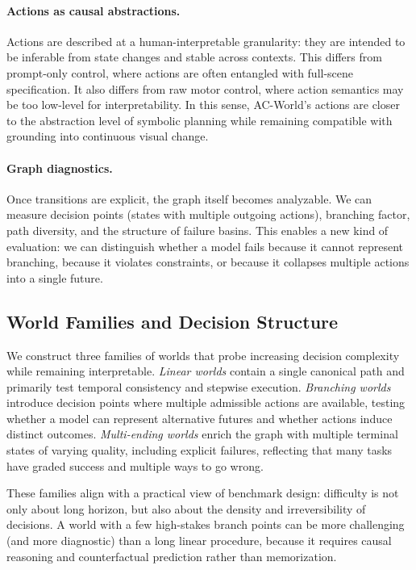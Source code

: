 \documentclass{article}
\theoremstyle{plain}
\theoremstyle{definition}
\theoremstyle{remark}
\begin{document}
\paragraph{Actions as causal abstractions.}
Actions are described at a human-interpretable granularity: they are intended to be inferable from state changes and stable across contexts. This differs from prompt-only control, where actions are often entangled with full-scene specification. It also differs from raw motor control, where action semantics may be too low-level for interpretability. In this sense, AC-World's actions are closer to the abstraction level of symbolic planning while remaining compatible with grounding into continuous visual change.

\paragraph{Graph diagnostics.}
Once transitions are explicit, the graph itself becomes analyzable. We can measure decision points (states with multiple outgoing actions), branching factor, path diversity, and the structure of failure basins. This enables a new kind of evaluation: we can distinguish whether a model fails because it cannot represent branching, because it violates constraints, or because it collapses multiple actions into a single future.

\subsection{World Families and Decision Structure}
We construct three families of worlds that probe increasing decision complexity while remaining interpretable.
\emph{Linear worlds} contain a single canonical path and primarily test temporal consistency and stepwise execution. \emph{Branching worlds} introduce decision points where multiple admissible actions are available, testing whether a model can represent alternative futures and whether actions induce distinct outcomes. \emph{Multi-ending worlds} enrich the graph with multiple terminal states of varying quality, including explicit failures, reflecting that many tasks have graded success and multiple ways to go wrong.

These families align with a practical view of benchmark design: difficulty is not only about long horizon, but also about the density and irreversibility of decisions. A world with a few high-stakes branch points can be more challenging (and more diagnostic) than a long linear procedure, because it requires causal reasoning and counterfactual prediction rather than memorization.
\end{document}
